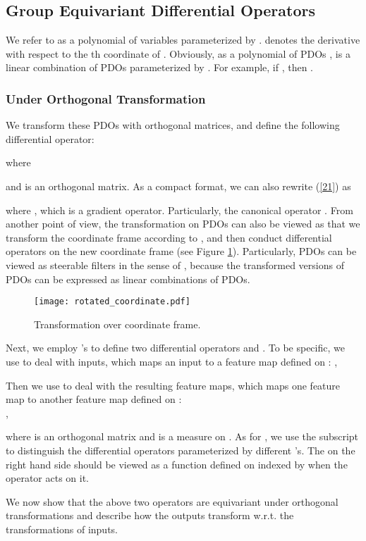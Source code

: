 \documentclass{article}
\begin{document}
\subsection{Group Equivariant Differential Operators}
We refer to  as a polynomial of  variables parameterized by .  denotes the derivative with respect to the th coordinate of . Obviously, as a polynomial of PDOs ,  is a linear combination of PDOs parameterized by . For example, if , then . 

\subsubsection{Under Orthogonal Transformation}
We transform these PDOs with orthogonal matrices, and define the following differential operator:

where 

and  is an orthogonal matrix. As a compact format, we can also rewrite (\ref{21}) as 

where , which is a gradient operator. Particularly, the canonical operator . From another point of view, the transformation on PDOs can also be viewed as that we transform the coordinate frame according to , and then conduct differential operators on the new coordinate frame (see Figure \ref{rotated}). Particularly, PDOs can be viewed as steerable filters in the sense of \cite{helor1996canonical}, because the transformed versions of PDOs can be expressed as linear combinations of PDOs.

\begin{figure}
	\centering
	\texttt{[image: rotated\_coordinate.pdf]} \caption{Transformation over coordinate frame.}
	\label{rotated}
\end{figure}

Next, we employ 's to define two differential operators  and . To be specific, we use  to deal with inputs, which maps an input  to a feature map defined on : ,

Then we use  to deal with the resulting feature maps, which maps one feature map  to another feature map defined on : \\
,

where  is an orthogonal matrix and  is a measure on . As for , we use the subscript  to distinguish the differential operators parameterized by different 's. The  on the right hand side should be viewed as a function defined on  indexed by  when the operator  acts on it.

We now show that the above two operators are equivariant under orthogonal transformations and describe how the outputs transform w.r.t. the transformations of inputs.
\end{document}
